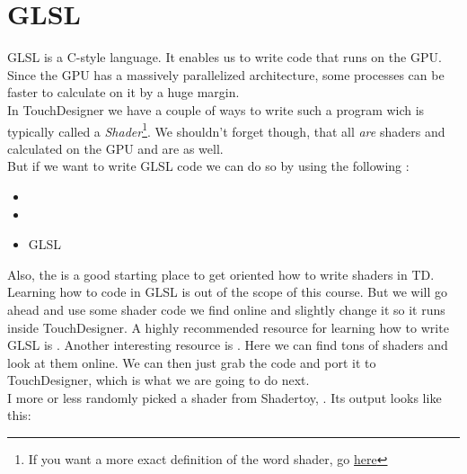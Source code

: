 
\section{GLSL}
GLSL is a C-style language. It enables us to write code that runs on the GPU. Since the GPU has a massively parallelized architecture, some processes can be faster to calculate on it by a huge margin.\\
In TouchDesigner we have a couple of ways to write such a program wich is typically called a \textit{Shader}\footnote{If you want a more exact definition of the word shader, go \href{https://www.khronos.org/opengl/wiki/OpenGL_Shading_Language}{here}}. We shouldn't forget though, that all \TOPs \textit{are} shaders and calculated on the GPU and \MATs are as well.\\
But if we want to write GLSL code we can do so by using the following \OPs:
\begin{itemize}
	\item {}
	\item {}
	\item GLSL \MAT
\end{itemize}
Also, the  is a good starting place to get oriented how to write shaders in TD.\\


Learning how to code in GLSL is out of the scope of this course. But we will go ahead and use some shader code we find online and slightly change it so it runs inside TouchDesigner. A highly recommended resource for learning how to write GLSL is . Another interesting resource is . Here we can find tons of shaders and look at them online. We can then just grab the code and port it to TouchDesigner, which is what we are going to do next.\\

I more or less randomly picked a shader from Shadertoy, . Its output looks like this:


